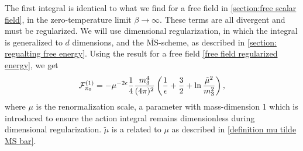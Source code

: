 The first integral is identical to what we find for a free field in \autoref{section:free scalar field}, in the zero-temperature limit $\beta \rightarrow \infty$.
These terms are all divergent and must be regularized. 
We will use dimensional regularization, in which the integral is generalized to $d$ dimensions, and the $\overline{\mathrm{MS}}$-scheme, as described in \autoref{section: regualting free energy}.
Using the result for a free field \cref{free field regularized energy}, we get
\begin{equation}
    \label{Free energy pi 0}
    \mathcal{F}^{(1)}_{\pi_0} 
    = 
    - \mu^{-2 \epsilon}  \frac{1}{4} \frac{m_3^4}{(4\pi)^2} 
    \left( \frac{1}{\epsilon} + \frac{3}{2} + \ln \frac{\tilde \mu^2}{m_3^2} \right),
\end{equation}
where $\mu$ is the renormalization scale, a parameter with mass-dimension 1 which is introduced to ensure the action integral remains dimensionless during dimensional regularization.
$\tilde \mu$ is a related to $\mu$ as described in \cref{definition mu tilde MS bar}.

